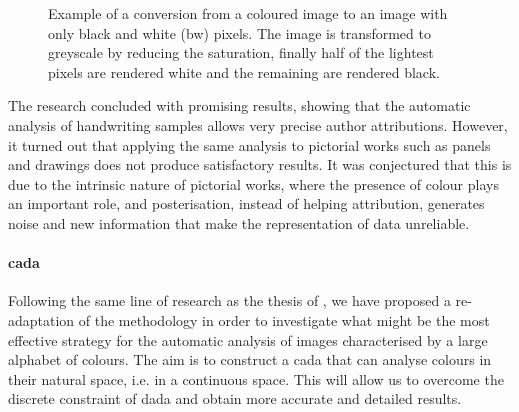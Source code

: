 \begin{toReview}
\begin{figure}[ht]
\begin{subfigure}{0.4\linewidth}
	\end{subfigure}
	\caption[BW transformation]{Example of a conversion from a coloured image to an image with only black and white (bw) pixels. The image is transformed to greyscale by reducing the saturation, finally half of the lightest pixels are rendered white and the remaining are rendered black.}
	\label{fig:example_bw}
\end{figure}

\noindent The research concluded with promising results, showing that the automatic analysis of handwriting samples allows very precise author attributions. However, it turned out that applying the same analysis to pictorial works such as panels and drawings does not produce satisfactory results. It was conjectured that this is due to the intrinsic nature of pictorial works, where the presence of colour plays an important role, and posterisation, instead of helping attribution, generates noise and new information that make the representation of data unreliable.

\paragraph{\gls{cada}}
Following the same line of research as the thesis of \citet{thesis}, we have proposed a re-adaptation of the methodology in order to investigate what might be the most effective strategy for the automatic analysis of images characterised by a large alphabet of colours. The aim is to construct a \gls{cada} that can analyse colours in their natural space, i.e. in a continuous space. This will allow us to overcome the discrete constraint of \gls{dada} and obtain more accurate and detailed results.


\end{toReview}
